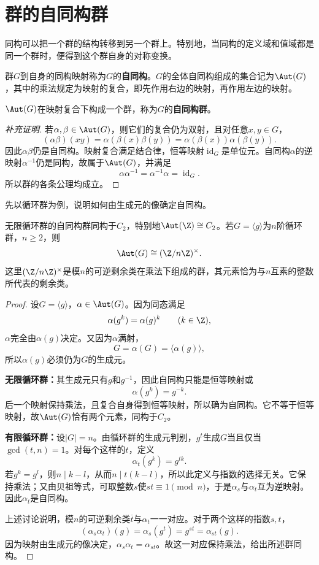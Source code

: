 \section{群的自同构群}

同构可以把一个群的结构转移到另一个群上。特别地，当同构的定义域和值域都是同一个群时，便得到这个群自身的对称变换。

\begin{definition}
群$G$到自身的同构映射称为$G$的\textbf{自同构}。$G$的全体自同构组成的集合记为$\Aut(G)$，其中的乘法规定为映射的复合，即先作用右边的映射，再作用左边的映射。
\end{definition}

\begin{proposition}
$\Aut(G)$在映射复合下构成一个群，称为$G$的\textbf{自同构群}。
\end{proposition}
\begin{proof}[补充证明]
若$\alpha,\beta\in\Aut(G)$，则它们的复合仍为双射，且对任意$x,y\in G$，
\[
(\alpha\beta)(xy)
=\alpha(\beta(x)\beta(y))
=\alpha(\beta(x))\alpha(\beta(y)).
\]
因此$\alpha\beta$仍是自同构。映射复合满足结合律，恒等映射$\operatorname{id}_G$是单位元。自同构$\alpha$的逆映射$\alpha^{-1}$仍是同构，故属于$\Aut(G)$，并满足
\[
\alpha\alpha^{-1}=\alpha^{-1}\alpha=\operatorname{id}_G.
\]
所以群的各条公理均成立。
\end{proof}

先以循环群为例，说明如何由生成元的像确定自同构。

\begin{proposition}
无限循环群的自同构群同构于$C_2$，特别地$\Aut(\Z)\cong C_2$。若$G=\langle g\rangle$为$n$阶循环群，$n\geq2$，则
\[
\Aut(G)\cong(\Z/n\Z)^\times.
\]
这里$(\Z/n\Z)^\times$是模$n$的可逆剩余类在乘法下组成的群，其元素恰为与$n$互素的整数所代表的剩余类。
\end{proposition}
\begin{proof}
设$G=\langle g\rangle$，$\alpha\in\Aut(G)$。因为同态满足
\[
\alpha(g^k)=\alpha(g)^k\qquad(k\in\Z),
\]
$\alpha$完全由$\alpha(g)$决定。又因为$\alpha$满射，
\[
G=\alpha(G)=\langle\alpha(g)\rangle,
\]
所以$\alpha(g)$必须仍为$G$的生成元。

\textbf{无限循环群：}其生成元只有$g$和$g^{-1}$，因此自同构只能是恒等映射或
\[
\alpha(g^k)=g^{-k}.
\]
后一个映射保持乘法，且复合自身得到恒等映射，所以确为自同构。它不等于恒等映射，故$\Aut(G)$恰有两个元素，同构于$C_2$。

\textbf{有限循环群：}设$|G|=n$。由循环群的生成元判别，$g^t$生成$G$当且仅当$\gcd(t,n)=1$。对每个这样的$t$，定义
\[
\alpha_t(g^k)=g^{tk}.
\]
若$g^k=g^l$，则$n\mid k-l$，从而$n\mid t(k-l)$，所以此定义与指数的选择无关。它保持乘法；又由贝祖等式，可取整数$s$使$st\equiv1\pmod n$，于是$\alpha_s$与$\alpha_t$互为逆映射。因此$\alpha_t$是自同构。

上述讨论说明，模$n$的可逆剩余类$\overline t$与$\alpha_t$一一对应。对于两个这样的指数$s,t$，
\[
(\alpha_s\alpha_t)(g)=\alpha_s(g^t)=g^{st}=\alpha_{st}(g).
\]
因为映射由生成元的像决定，$\alpha_s\alpha_t=\alpha_{st}$。故这一对应保持乘法，给出所述群同构。
\end{proof}

